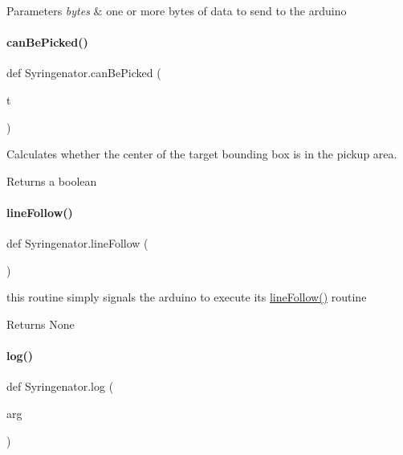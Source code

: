 \begin{DoxyParams}{Parameters}
{\em bytes} & one or more bytes of data to send to the arduino \\
\hline
\end{DoxyParams}
\mbox{\label{namespaceSyringenator_acb08d40f080a03cb4e7a43ee3ab4854b}} 
\paragraph{\texorpdfstring{canBePicked()}{canBePicked()}}
{\footnotesize\ttfamily def Syringenator.\+can\+Be\+Picked (\begin{DoxyParamCaption}\item[{}]{t }\end{DoxyParamCaption})}

Calculates whether the center of the target bounding box is in the pickup area.

\begin{DoxyReturn}{Returns}
a boolean 
\end{DoxyReturn}
\mbox{\label{namespaceSyringenator_a824ef6e71bc0975483435ffbdd58cb3e}} 
\paragraph{\texorpdfstring{lineFollow()}{lineFollow()}}
{\footnotesize\ttfamily def Syringenator.\+line\+Follow (\begin{DoxyParamCaption}{ }\end{DoxyParamCaption})}

this routine simply signals the arduino to execute its \mbox{\hyperlink{namespaceSyringenator_a824ef6e71bc0975483435ffbdd58cb3e}{line\+Follow()}} routine

\begin{DoxyReturn}{Returns}
None 
\end{DoxyReturn}
\mbox{\label{namespaceSyringenator_a263a26fdb4da94f277fb51f3e740f30d}} 
\paragraph{\texorpdfstring{log()}{log()}}
{\footnotesize\ttfamily def Syringenator.\+log (\begin{DoxyParamCaption}\item[{}]{arg }\end{DoxyParamCaption})}

